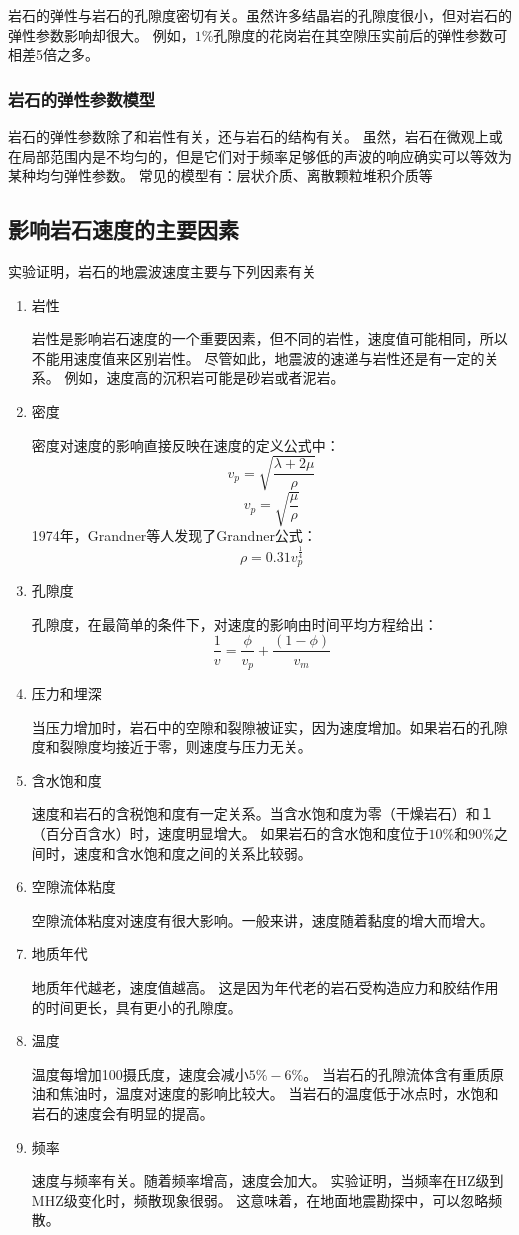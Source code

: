 \documentclass[hyperref,UTF-8,twoside]{ctexart}
\begin{document}
岩石的弹性与岩石的孔隙度密切有关。虽然许多结晶岩的孔隙度很小，但对岩石的弹性参数影响却很大。
例如，$1\%$孔隙度的花岗岩在其空隙压实前后的弹性参数可相差5倍之多。
\subsubsection{岩石的弹性参数模型}
岩石的弹性参数除了和岩性有关，还与岩石的结构有关。
虽然，岩石在微观上或在局部范围内是不均匀的，但是它们对于频率足够低的声波的响应确实可以等效为某种均匀弹性参数。
常见的模型有：层状介质、离散颗粒堆积介质等
\subsection{影响岩石速度的主要因素}
实验证明，岩石的地震波速度主要与下列因素有关
\begin{enumerate}
\item 岩性

岩性是影响岩石速度的一个重要因素，但不同的岩性，速度值可能相同，所以不能用速度值来区别岩性。
尽管如此，地震波的速递与岩性还是有一定的关系。
例如，速度高的沉积岩可能是砂岩或者泥岩。
\item 密度

密度对速度的影响直接反映在速度的定义公式中：
$$v_{p}=\sqrt{\frac{\lambda+2\mu}{\rho}}$$
$$v_{p}=\sqrt{\frac{\mu}{\rho}}$$
1974年，Grandner等人发现了Grandner公式：
$$\rho=0.31v_{p}^{\frac{1}{4}}$$
\item 孔隙度

孔隙度，在最简单的条件下，对速度的影响由时间平均方程给出：
$$\frac{1}{v}=\frac{\phi}{v_{p}}+\frac{(1-\phi)}{v_{m}}$$
\item 压力和埋深

当压力增加时，岩石中的空隙和裂隙被证实，因为速度增加。如果岩石的孔隙度和裂隙度均接近于零，则速度与压力无关。
\item 含水饱和度

速度和岩石的含税饱和度有一定关系。当含水饱和度为零（干燥岩石）和１（百分百含水）时，速度明显增大。
如果岩石的含水饱和度位于$10\%$和$90\%$之间时，速度和含水饱和度之间的关系比较弱。
\item 空隙流体粘度

空隙流体粘度对速度有很大影响。一般来讲，速度随着黏度的增大而增大。
\item 地质年代

地质年代越老，速度值越高。
这是因为年代老的岩石受构造应力和胶结作用的时间更长，具有更小的孔隙度。
\item 温度

温度每增加100摄氏度，速度会减小$5\%-6\%$。
当岩石的孔隙流体含有重质原油和焦油时，温度对速度的影响比较大。
当岩石的温度低于冰点时，水饱和岩石的速度会有明显的提高。
\item 频率

速度与频率有关。随着频率增高，速度会加大。
实验证明，当频率在HZ级到MHZ级变化时，频散现象很弱。
这意味着，在地面地震勘探中，可以忽略频散。
\end{enumerate}
\end{document}

